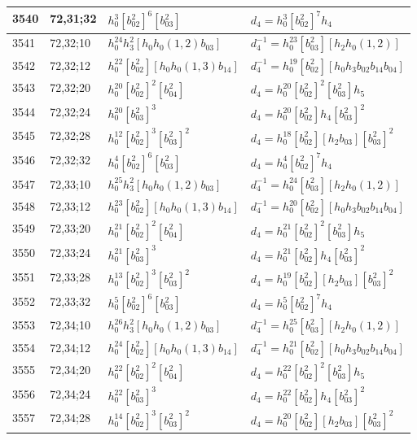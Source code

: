\documentclass{article}
\begin{document}
\begin{longtable}{|l|l|>{\raggedright\arraybackslash}p{6cm}|>{\raggedright\arraybackslash}p{6cm}|}
\hline
3540 & 72,31;32 & $h_0^3[b_{02}^2]^6[b_{03}^2]$ &$d_{4}=h_0^3[b_{02}^2]^7h_4$\\
\hline
3541 & 72,32;10 & $h_0^{24}h_3^2[h_0h_0(1, 2)b_{03}]$ & $d_{4}^{-1}=h_0^{23}[b_{03}^2][h_2h_0(1, 2)]$\\
\hline
3542 & 72,32;12 & $h_0^{22}[b_{02}^2][h_0h_0(1, 3)b_{14}]$ & $d_{4}^{-1}=h_0^{19}[b_{02}^2][h_0h_3b_{02}b_{14}b_{04}]$\\
\hline
3543 & 72,32;20 & $h_0^{20}[b_{02}^2]^2[b_{04}^2]$ &$d_{4}=h_0^{20}[b_{02}^2]^2[b_{03}^2]h_5$\\
\hline
3544 & 72,32;24 & $h_0^{20}[b_{03}^2]^3$ &$d_{4}=h_0^{20}[b_{02}^2]h_4[b_{03}^2]^2$\\
\hline
3545 & 72,32;28 & $h_0^{12}[b_{02}^2]^3[b_{03}^2]^2$ &$d_{4}=h_0^{18}[b_{02}^2][h_2b_{03}][b_{03}^2]^2$\\
\hline
3546 & 72,32;32 & $h_0^4[b_{02}^2]^6[b_{03}^2]$ &$d_{4}=h_0^4[b_{02}^2]^7h_4$\\
\hline
3547 & 72,33;10 & $h_0^{25}h_3^2[h_0h_0(1, 2)b_{03}]$ & $d_{4}^{-1}=h_0^{24}[b_{03}^2][h_2h_0(1, 2)]$\\
\hline
3548 & 72,33;12 & $h_0^{23}[b_{02}^2][h_0h_0(1, 3)b_{14}]$ & $d_{4}^{-1}=h_0^{20}[b_{02}^2][h_0h_3b_{02}b_{14}b_{04}]$\\
\hline
3549 & 72,33;20 & $h_0^{21}[b_{02}^2]^2[b_{04}^2]$ &$d_{4}=h_0^{21}[b_{02}^2]^2[b_{03}^2]h_5$\\
\hline
3550 & 72,33;24 & $h_0^{21}[b_{03}^2]^3$ &$d_{4}=h_0^{21}[b_{02}^2]h_4[b_{03}^2]^2$\\
\hline
3551 & 72,33;28 & $h_0^{13}[b_{02}^2]^3[b_{03}^2]^2$ &$d_{4}=h_0^{19}[b_{02}^2][h_2b_{03}][b_{03}^2]^2$\\
\hline
3552 & 72,33;32 & $h_0^5[b_{02}^2]^6[b_{03}^2]$ &$d_{4}=h_0^5[b_{02}^2]^7h_4$\\
\hline
3553 & 72,34;10 & $h_0^{26}h_3^2[h_0h_0(1, 2)b_{03}]$ & $d_{4}^{-1}=h_0^{25}[b_{03}^2][h_2h_0(1, 2)]$\\
\hline
3554 & 72,34;12 & $h_0^{24}[b_{02}^2][h_0h_0(1, 3)b_{14}]$ & $d_{4}^{-1}=h_0^{21}[b_{02}^2][h_0h_3b_{02}b_{14}b_{04}]$\\
\hline
3555 & 72,34;20 & $h_0^{22}[b_{02}^2]^2[b_{04}^2]$ &$d_{4}=h_0^{22}[b_{02}^2]^2[b_{03}^2]h_5$\\
\hline
3556 & 72,34;24 & $h_0^{22}[b_{03}^2]^3$ &$d_{4}=h_0^{22}[b_{02}^2]h_4[b_{03}^2]^2$\\
\hline
3557 & 72,34;28 & $h_0^{14}[b_{02}^2]^3[b_{03}^2]^2$ &$d_{4}=h_0^{20}[b_{02}^2][h_2b_{03}][b_{03}^2]^2$\\

\end{longtable}
\end{document}

